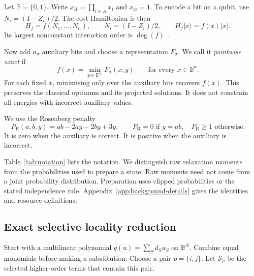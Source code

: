 \documentclass[a4paper,onecolumn,11pt,unpublished]{quantumarticle}
\theoremstyle{remark}
\begin{document}
Let $\mathbb B=\{0,1\}$. Write $x_A=\prod_{i\in A}x_i$ and
$x_\varnothing=1$. To encode a bit on a qubit, use $N_i=(I-Z_i)/2$.
The cost Hamiltonian is then
\begin{equation}
H_f=f(N_1,\ldots,N_n),\qquad N_i=(I-Z_i)/2,\qquad
H_f|x\rangle=f(x)|x\rangle.
\label{eq:diagonal-cost}
\end{equation}
Its largest nonconstant interaction order is $\deg(f)$~\cite{Hadfield2021}.

Now add $a_\sigma$ auxiliary bits and choose a representation $F_\sigma$.
We call it \emph{pointwise exact} if
\begin{equation}
f(x)=\min_{y\in\mathbb B^{a_\sigma}}F_\sigma(x,y)
\qquad\text{for every }x\in\mathbb B^n.
\label{eq:pointwise-exactness}
\end{equation}
For each fixed $x$, minimising only over the auxiliary bits recovers $f(x)$.
This preserves the classical optimum and its projected solutions.
It does not constrain all energies with incorrect auxiliary values.

We use the Rosenberg penalty~\cite{Rosenberg1975}
\begin{equation}
P_{\mathrm R}(a,b,y)=ab-2ay-2by+3y,
\qquad P_{\mathrm R}=0\text{ if }y=ab,
\quad P_{\mathrm R}\geq1\text{ otherwise}.
\label{eq:rosenberg}
\end{equation}
It is zero when the auxiliary is correct. It is positive when the auxiliary
is incorrect.

Table~\ref{tab:notation} lists the notation. We distinguish raw relaxation
moments from the probabilities used to prepare a state. Raw moments need
not come from a joint probability distribution. Preparation uses clipped
probabilities or the stated independence rule.
Appendix~\ref{app:background-details} gives the identities and resource
definitions.

\subsection{Exact selective locality reduction}
\label{sec:cubic-quadratization}
\label{sec:one-step-substitution}
\label{sec:compositional-exactness}

Start with a multilinear polynomial $q(u)=\sum_S d_Su_S$ on $\mathbb B^N$.
Combine equal monomials before making a substitution. Choose a pair
$p=\{i,j\}$. Let $\mathcal S_p$ be the selected higher-order terms that
contain this pair.
\end{document}
